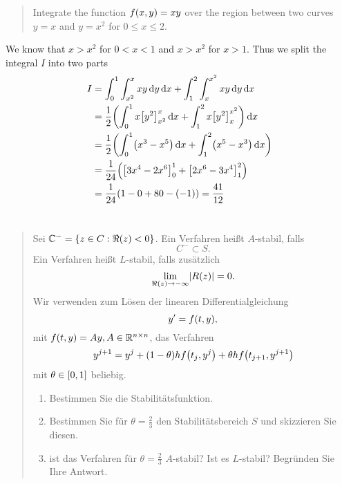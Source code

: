 \documentclass{exercise}
\begin{document}
	\begin{quote}
		Integrate the function \(f\parentheses*{x, y} = xy\) over the region between two curves \(y = x\) and \(y = x^2\) for \(0 \le x \le 2\).
	\end{quote}

	We know that \(x > x^2\) for \(0 < x < 1\) and \(x > x^2\) for \(x > 1\).
	Thus we split the integral \(I\) into two parts
	\begin{align*}
		I &= \int_0^1 \int_{x^2}^x xy\d y\d x + \int_1^2 \int_x^{x^2}xy\d y\d x\\
		&= \frac{1}{2}\parentheses*{\int_0^1 x\brackets*{y^2}_{x^2}^x \d x + \int_1^2 x\brackets*{y^2}_x^{x^2}}\d x\\
		&= \frac{1}{2}\parentheses*{\int_0^1 \parentheses*{x^3 - x^5}\d x + \int_1^2 \parentheses*{x^5 - x^3}\d x}\\
		&= \frac{1}{24}\parentheses*{\brackets*{3x^4 - 2x^6}_0^1 + \brackets*{2x^6 - 3x^4}_1^2}\\
		&= \frac{1}{24}\parentheses*{1 - 0 + 80 - \parentheses*{-1}} = \frac{41}{12}
	\end{align*}


	\section{}

	\begin{quote}
		Sei \(\C^- = \braces*{z \in C : \Re\parentheses*{z} < 0}\).
		Ein Verfahren heißt \(A\)-stabil, falls
		\[
			C^- \subset S.
		\]
		Ein Verfahren heißt \(L\)-stabil, falls zusätzlich
		\[
			\lim_{\Re\parentheses*{z} \to -\infty}\absolute*{R\parentheses*{z}} = 0.
		\]
		Wir verwenden zum Lösen der linearen Differentialgleichung
		\[
			y' = f\parentheses*{t, y},
		\]
		mit \(f\parentheses*{t, y} = Ay, A \in \R^{n \times n}\), das Verfahren
		\[
			y^{j + 1} = y^j + \parentheses*{1 - \theta}hf\parentheses*{t_j, y^j} + \theta hf\parentheses*{t_{j + 1}, y^{j + 1}}
		\]
		mit \(\theta \in \brackets*{0, 1}\) beliebig.
		\begin{enumerate}
			\item Bestimmen Sie die Stabilitätsfunktion.
			\item Bestimmen Sie für \(\theta = \frac{2}{3}\) den Stabilitätsbereich \(S\) und skizzieren Sie diesen.
			\item ist das Verfahren für \(\theta = \frac{2}{3}\) \(A\)-stabil?
			Ist es \(L\)-stabil?
			Begründen Sie Ihre Antwort.
		\end{enumerate}
	\end{quote}
\end{document}
